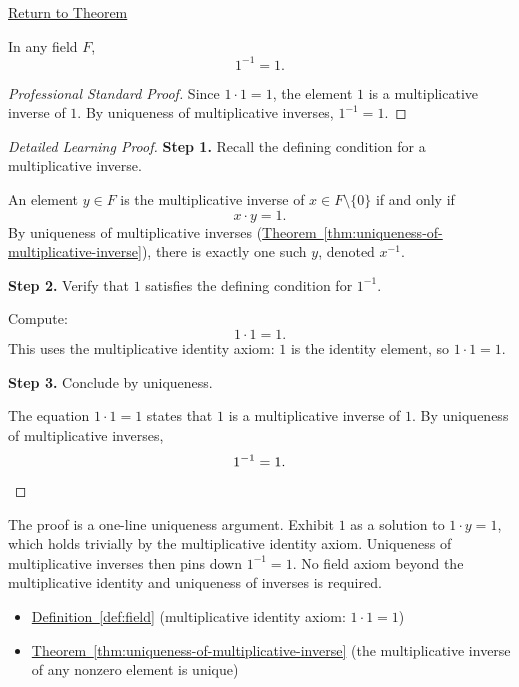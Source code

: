 \newpage
{}
\label{prf:one-inverse-is-one}

\begin{remark*}[Return]
\hyperref[thm:one-inverse-is-one]{Return to Theorem}
\end{remark*}

\begin{theorem*}
In any field $F$,
\[
1^{-1} = 1.
\]
\end{theorem*}

\begin{proof}[Professional Standard Proof]
\LRAProofBodyStart
Since $1\cdot 1 = 1$, the element $1$ is a multiplicative inverse of $1$.
By uniqueness of multiplicative inverses, $1^{-1} = 1$.
\end{proof}

\begin{proof}[Detailed Learning Proof]
\LRAProofBodyStart

\textbf{Step 1.} Recall the defining condition for a multiplicative inverse.

An element $y\in F$ is the multiplicative inverse of $x\in F\setminus\{0\}$
if and only if
\[
x\cdot y = 1.
\]
By uniqueness of multiplicative inverses
(\hyperref[thm:uniqueness-of-multiplicative-inverse]{Theorem~\ref*{thm:uniqueness-of-multiplicative-inverse}}),
there is exactly one such $y$, denoted $x^{-1}$.

\textbf{Step 2.} Verify that $1$ satisfies the defining condition for $1^{-1}$.

Compute:
\[
1\cdot 1 = 1.
\]
This uses the multiplicative identity axiom: $1$ is the identity element,
so $1\cdot 1 = 1$.

\textbf{Step 3.} Conclude by uniqueness.

The equation $1\cdot 1 = 1$ states that $1$ is a multiplicative inverse
of $1$.  By uniqueness of multiplicative inverses,
\[
1^{-1} = 1. \qedhere
\]
\end{proof}

\begin{remark*}
The proof is a one-line uniqueness argument.  Exhibit $1$ as a solution to
$1\cdot y = 1$, which holds trivially by the multiplicative identity axiom.
Uniqueness of multiplicative inverses then pins down $1^{-1} = 1$.  No field
axiom beyond the multiplicative identity and uniqueness of inverses is
required.
\end{remark*}

\begin{dependencies}
\begin{itemize}
  \item \hyperref[def:field]{Definition~\ref*{def:field}}
        \textnormal{(multiplicative identity axiom: $1\cdot 1 = 1$)}
  \item \hyperref[thm:uniqueness-of-multiplicative-inverse]{Theorem~\ref*{thm:uniqueness-of-multiplicative-inverse}}
        \textnormal{(the multiplicative inverse of any nonzero element is unique)}
\end{itemize}
\end{dependencies}

\clearpage
